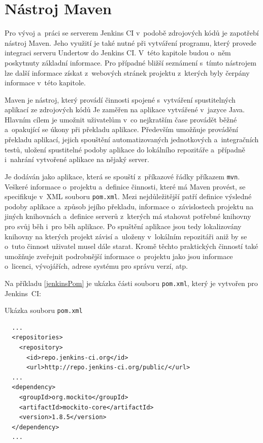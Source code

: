             
         
    \section{Nástroj Maven} \label{maven}
        Pro vývoj a~práci se serverem Jenkins CI v~podobě zdrojových kódů je zapotřebí nástroj Maven. 
        Jeho využití je také nutné při vytváření programu, který provede integraci serveru Undertow do Jenkins CI. 
        V~této kapitole budou o~něm poskytnuty základní informace. Pro případné bližší
        seznámení s~tímto nástrojem lze další informace získat z~webových stránek projektu \cite{mavenWeb}
        z~kterých byly čerpány informace v~této kapitole. 
        
        Maven je nástroj, který provádí činnosti spojené s~vytváření spustitelných aplikací ze zdrojových kódů 
        Je zaměřen na aplikace vytvářené v~jazyce Java. Hlavním cílem je umožnit uživatelům v~co nejkratším
        čase provádět běžné a~opakující se úkony při překladu aplikace. Především umožňuje
        provádění překladu aplikací, jejich spouštění automatizovaných jednotkových
a~integračních testů, uložení spustitelné podoby aplikace do lokálního repozitáře 
        a~případně i~nahrání vytvořené aplikace na nějaký server. 

        Je dodáván jako aplikace, která se spouští z~příkazové řádky příkazem \texttt{mvn}. Veškeré
        informace o~projektu a~definice činnosti, které má Maven provést, se specifikuje 
        v~XML souboru \texttt{pom.xml}. Mezi nejdůležitější patří definice výsledné podoby aplikace
        a~způsob jejího překladu, informace o~závislostech
        projektu na jiných knihovnách a~definice serverů z~kterých má stahovat potřebné knihovny pro svůj 
        běh i~pro běh aplikace. Po spuštění aplikace jsou tedy lokalizovány knihovny na kterých projekt
        závisí a~uloženy v~lokálním repozitáři aniž by se o~tuto činnost uživatel musel dále starat.
        Kromě těchto praktických činností také umožňuje zveřejnit podrobnější informace o~projektu         
        jako jsou informace o~licenci, vývojářích, adrese systému pro správu verzí, atp.


        Na příkladu \ref{jenkinsPom} je ukázka části souboru \texttt{pom.xml}, který je vytvořen pro Jenkins~CI:
        \begin{priklad} \label{jenkinsPom} 
            Ukázka souboru \texttt{pom.xml}
\begin{verbatim}
  ...
  <repositories>
    <repository>
      <id>repo.jenkins-ci.org</id>
      <url>http://repo.jenkins-ci.org/public/</url>
  ...
  <dependency>
    <groupId>org.mockito</groupId>
    <artifactId>mockito-core</artifactId>
    <version>1.8.5</version>
  </dependency>
  ...
\end{verbatim}
        \end{priklad}

